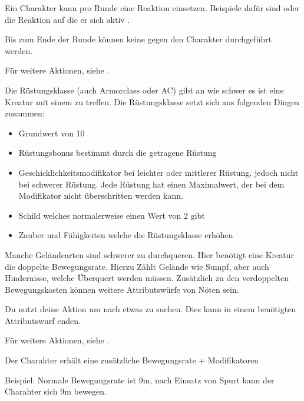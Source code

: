 Ein Charakter kann pro Runde eine Reaktion einsetzen. Beispiele dafür sind  oder die Reaktion auf die er sich aktiv .



Bis zum Ende der Runde können keine  gegen den Charakter durchgeführt werden.

Für weitere Aktionen, siehe .



Die Rüstungsklasse (auch Armorclass oder AC) gibt an wie schwer es ist eine Kreatur mit einem  zu treffen. Die Rüstungsklasse setzt sich aus folgenden Dingen zusammen:
\begin{itemize}
\item Grundwert von 10
\item Rüstungsbonus bestimmt durch die getragene Rüstung
\item Geschicklichkeitsmodifikator bei leichter oder mittlerer Rüstung, jedoch nicht bei schwerer Rüstung. Jede Rüstung hat einen Maximalwert, der bei dem Modifikator nicht überschritten werden kann.
\item Schild welches normalerweise einen Wert von 2 gibt
\item Zauber und Fähigkeiten welche die Rüstungsklasse erhöhen
\end{itemize}



Manche Geländearten sind schwerer zu durchqueren. Hier benötigt eine Kreatur die doppelte Bewegungsrate. Hierzu Zählt Gelände wie Sumpf, aber auch Hindernisse, welche Überquert werden müssen. Zusätzlich zu den verdoppelten Bewegungskosten können weitere Attributswürfe von Nöten sein.



Du nutzt deine Aktion um nach etwas zu suchen. Dies kann in einem benötigten Attributswurf enden.

Für weitere Aktionen, siehe .



Der Charakter erhält eine zusätzliche Bewegungsrate + Modifikatoren

Beispiel: Normale Bewegungsrate ist 9m, nach Einsatz von Spurt kann der Charahter sich 9m bewegen.

